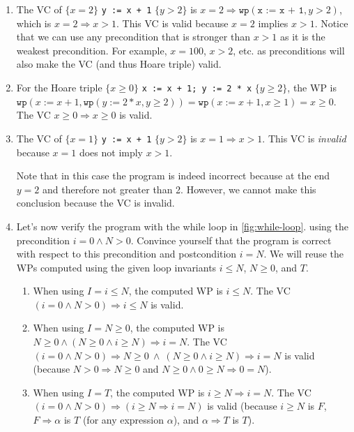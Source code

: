 \documentclass[oneside,11pt,dvipsnames]{book}
\renewcommand{\implies}{\Rightarrow}
\newcommand{\code}[1]{\texttt{#1}}
\begin{document}
\begin{enumerate}
\item The VC of $\{x = 2\}$ \code{y := x + 1} $\{y > 2\}$ is $x = 2 \implies \code{wp}(\code{x := x + 1}, y > 2)$, which is $x = 2 \implies x > 1$.  This VC is valid because $x = 2$ implies $x  > 1$.  Notice that we can use any precondition that is stronger than $x > 1$ as it is the weakest precondition.  For example, $x = 100$, $x > 2$, etc. as preconditions will also make the VC (and thus Hoare triple) valid.

\item For the Hoare triple $\{x \ge 0\}$ \code{x := x + 1; y := 2 * x} $\{y \ge 2\}$, the WP is $\code{wp}(x := x + 1, \code{wp}(y := 2 * x, y \ge 2)) = \code{wp}(x := x + 1, x \ge 1) = x \ge 0 $.  The VC $x \ge 0 \implies x  \ge 0$ is valid.


\item The VC of $\{x = 1\}$ \code{y := x + 1} $\{y > 2\}$ is $x = 1 \implies x > 1$.  This VC is \emph{invalid} because $x = 1$ does not imply $x  > 1$.

Note that in this case the program is indeed incorrect because at the end $y = 2$ and therefore not greater than 2. However, we cannot make this conclusion because the VC is invalid. 

\item Let's now verify the program with the while loop in \autoref{fig:while-loop}.  
using the precondition $i = 0 \land N > 0$.  Convince yourself that the program is correct with respect to this precondition and postcondition $i = N$. We will reuse the WPs computed using the given loop invariants $i \le N$, $N \ge 0$, and $T$.  


\begin{enumerate}
\item When using $I = i \le N$, the computed WP is $i \le N$. The VC $(i = 0 \land N > 0) \implies i \le N$ is valid.
\item When using $I = N \ge 0$, the computed WP is $N \ge 0 \land (N \ge 0  \land i \ge N)  \implies i = N$. The VC $(i = 0 \land N > 0) \implies N \ge 0 ~\land~ (N \ge 0  \land i \ge N)  \implies i = N$ is valid (because $N > 0 \implies N \ge 0$ and $N \ge 0 \land 0 \ge N \implies 0 = N$).
\item When using $I = T$, the computed WP is $i \ge N \implies i = N$. The VC $(i = 0 \land N > 0) \implies (i \ge N \implies i = N)$ is valid (because $i \ge N$ is $F$, $F \implies \alpha$ is $T$ (for any expression $\alpha$), and $\alpha \implies T$ is $T$).
\end{enumerate}
\end{enumerate}
\end{document}
